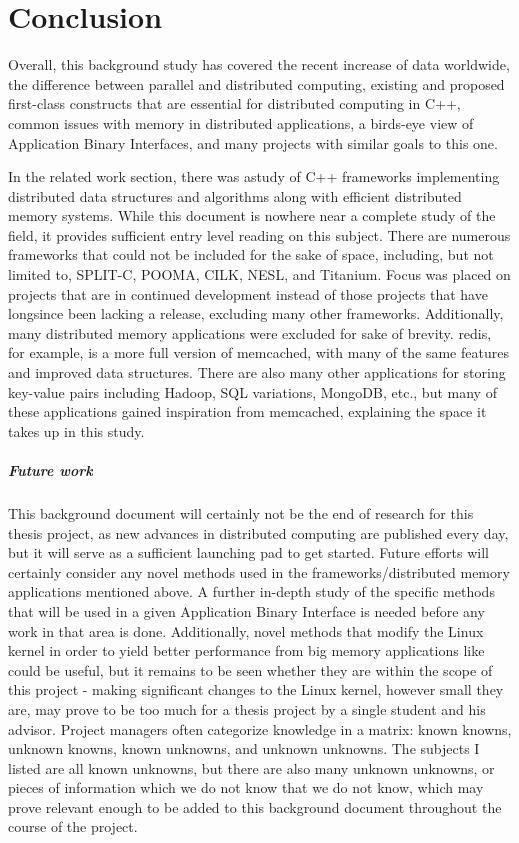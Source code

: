 \chapter{Conclusion} \label{conclusion}
Overall, this background study has covered the recent increase of data worldwide, the difference between parallel and distributed computing, existing and proposed first-class constructs that are essential for distributed computing in C++, common issues with memory in distributed applications, a birds-eye view of Application Binary Interfaces, and many projects with similar goals to this one. 


In the related work section, there was astudy of C++ frameworks implementing distributed data structures and algorithms along with efficient distributed memory systems. While this document is nowhere near a complete study of the field, it provides sufficient entry level reading on this subject. There are numerous frameworks that could not be included for the sake of space, including, but not limited to, SPLIT-C, POOMA, CILK, NESL, and Titanium. Focus was placed on projects that are in continued development instead of those projects that have longsince been lacking a release, excluding many other frameworks. Additionally, many distributed memory applications were excluded for sake of brevity. redis, for example, is a more full version of memcached, with many of the same features and improved data structures. There are also many other applications for storing key-value pairs including Hadoop, SQL variations, MongoDB, etc., but many of these applications gained inspiration from memcached, explaining the space it takes up in this study. 

\paragraph{Future work}
This background document will certainly not be the end of research for this thesis project, as new advances in distributed computing are published every day, but it will serve as a sufficient launching pad to get started. Future efforts will certainly consider any novel methods used in the frameworks/distributed memory applications mentioned above. A further in-depth study of the specific methods that will be used in a given Application Binary Interface is needed before any work in that area is done. Additionally, novel methods that modify the Linux kernel in order to yield better performance from big memory applications like \cite{virtual_memory_tlb} could be useful, but it remains to be seen whether they are within the scope of this project - making significant changes to the Linux kernel, however small they are, may prove to be too much for a thesis project by a single student and his advisor. Project managers often categorize knowledge in a matrix: known knowns, unknown knowns, known unknowns, and unknown unknowns. The subjects I listed are all known unknowns, but there are also many unknown unknowns, or pieces of information which we do not know that we do not know, which may prove relevant enough to be added to this background document throughout the course of the project. 

